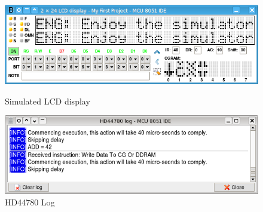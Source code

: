 \documentclass[a4paper,twoside,12pt]{book}
\begin{document}
			\begin{figure}[h!]
				\begin{minipage}[b]{.5\textwidth}
					\begin{minipage}[b]{\textwidth}
						\centering{}
						\includegraphics[width=1\textwidth]{img/043.png}
						\caption{Simulated LCD display}
					\end{minipage}

					\begin{minipage}[b]{\textwidth}
						\centering{}
						\includegraphics[width=1\textwidth]{img/044.png}
						\caption{HD44780 Log}
					\end{minipage}


\end{minipage}
\end{figure}
\end{document}
